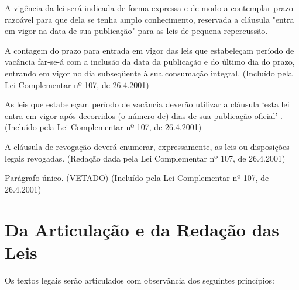 \documentclass[a5paper,capitulo,titlepage=false]{br-lex}
\begin{document}
\artigo A vigência da lei será indicada de forma expressa e de modo a contemplar prazo razoável para que dela se tenha amplo conhecimento, reservada a cláusula "entra em vigor na data de sua publicação" para as leis de pequena repercussão.

\begin{paragrafos}

\paragrafo A contagem do prazo para entrada em vigor das leis que estabeleçam período de vacância far-se-á com a inclusão da data da publicação e do último dia do prazo, entrando em vigor no dia subseqüente à sua consumação integral.    (Incluído pela Lei Complementar nº 107, de 26.4.2001)

\paragrafo As leis que estabeleçam período de vacância deverão utilizar a cláusula ‘esta lei entra em vigor após decorridos (o número de) dias de sua publicação oficial’ .    (Incluído pela Lei Complementar nº 107, de 26.4.2001)

\end{paragrafos}


\artigo A cláusula de revogação deverá enumerar, expressamente, as leis ou disposições legais revogadas.    (Redação dada pela Lei Complementar nº 107, de 26.4.2001)

Parágrafo único. (VETADO)     (Incluído pela Lei Complementar nº 107, de 26.4.2001)

\section[Da Articulação e da Redação das Leis]{Da Articulação e da Redação das Leis}

\artigo Os textos legais serão articulados com observância dos seguintes princípios:
\end{document}
